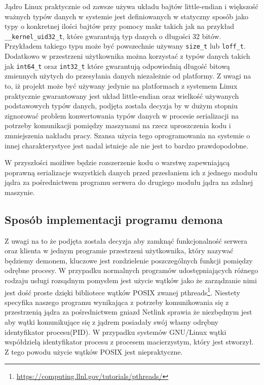 \documentclass[10pt]{scrartcl}
\begin{document}
Jądro Linux praktycznie od zawsze używa układu bajtów little-endian i większość ważnych typów danych w systemie jest definiowanych w statyczny sposób jako typy o konkretnej ilości bajtów przy pomocy makr takich jak na przykład \texttt{\_\_kernel\_uid32\_t}, które gwarantują typ danych o długości 32 bitów. Przykładem takiego typu może być powszechnie używany \texttt{size\_t} lub \texttt{loff\_t}. Dodatkowo w przestrzeni użytkownika można korzystać z typów danych takich jak \texttt{int64\_t} oraz \texttt{int32\_t} które gwarantują odpowiednią długość bitową zmiennych użytych do przesyłania danych niezależnie od platformy. Z uwagi na to, iż projekt może być używany jedynie na platformach z systemem Linux praktycznie gwarantowany jest układ little-endian oraz wielkość używanych podstawowych typów danych, podjęta została decyzja by w dużym stopniu zignorować problem konwertowania typów danych w procesie serializacji na potrzeby komunikacji pomiędzy maszynami na rzecz uproszczenia kodu i zmniejszenia nakładu pracy. Szansa użycia tego oprogramowania na systemie o innej charakterystyce jest nadal istnieje ale nie jest to bardzo prawdopodobne.

W przyszłości możliwe będzie rozszerzenie kodu o warstwę zapewniającą poprawną serializacje wszystkich danych przed przesłaniem ich z jednego modułu jądra za pośrednictwem programu serwera do drugiego modułu jądra na zdalnej maszynie.

\subsection{Sposób implementacji programu demona}
\label{daemonimplementation}

Z uwagi na to że podjęta została decyzja aby zamknąć funkcjonalność serwera oraz klienta w jednym programie przestrzeni użytkownika, który nazywać będziemy demonem, kluczowe jest rozdzielenie poszczególnych funkcji pomiędzy odrębne procesy. W przypadku normalnych programów udostępniających różnego rodzaju usługi rozsądnym pomysłem jest użycie wątków jako że zarządzanie nimi jest dość proste dzięki bibliotece wątków POSIX zwanej pthreads\footnote{\url{https://computing.llnl.gov/tutorials/pthreads/}}. Niestety specyfika naszego programu wynikająca z potrzeby komunikowania się z przestrzenią jądra za pośrednictwem gniazd Netlink sprawia że niezbędnym jest aby wątki komunikujące się z jądrem posiadały swój własny odrębny identyfikator procesu(PID). W przypadku systemów GNU/Linux wątki współdzielą identyfikator procesu z procesem macierzystym, który jest stworzył. Z tego powodu użycie wątków POSIX jest niepraktyczne.
\end{document}

